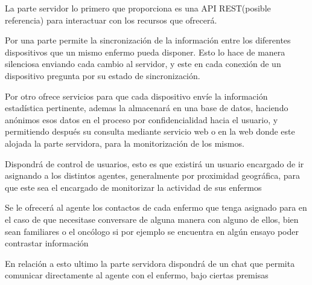 \documentclass[../pfc.tex]{subfiles}
\begin{document}
	La parte servidor lo primero que proporciona es una API REST(posible referencia) para interactuar con los recursos que ofrecerá.
	
	Por una parte permite la sincronización de la información entre los diferentes dispositivos  que un mismo enfermo pueda disponer. Esto lo hace de manera silenciosa enviando cada cambio al servidor, y este en cada conexión de un dispositivo pregunta por su estado de sincronización.
	
	Por otro ofrece servicios para que cada dispositivo envíe la información estadística pertinente, ademas la almacenará en una base de datos, haciendo anónimos esos datos en el proceso por confidencialidad hacia el usuario, y permitiendo después su consulta mediante servicio web o en la web donde este alojada la parte servidora, para la monitorización de los mismos.
	
	Dispondrá de control de usuarios, esto es que existirá un usuario encargado de ir asignando a los distintos agentes, generalmente por proximidad geográfica, para que este sea el encargado de monitorizar la actividad de sus enfermos 
	
	Se le ofrecerá al agente los contactos de cada enfermo que tenga asignado para en el caso de que necesitase conversare de alguna manera con alguno de ellos, bien sean familiares o el oncólogo si por ejemplo se encuentra en algún ensayo poder contrastar información
	
	En relación a esto ultimo la parte servidora dispondrá de un chat que permita comunicar directamente al agente con el enfermo, bajo ciertas premisas 
	
\end{document}
